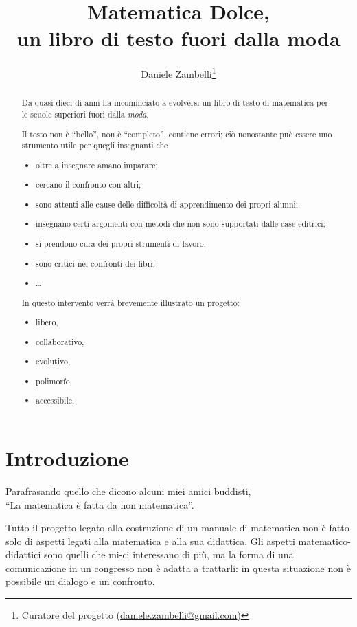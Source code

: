 \documentclass[a4paper,10pt]{article}
\title{Matematica Dolce,\\ 
un libro di testo fuori dalla moda}
\author{Daniele Zambelli\footnote{Curatore del progetto 
(\href{mailto:daniele.zambelli@gmail.com}{daniele.zambelli@gmail.com})}}
\begin{document}
\maketitle

\begin{abstract}
Da quasi dieci di anni ha incominciato a evolversi un libro di testo di 
matematica per le scuole superiori fuori dalla \emph{moda}.

Il testo non è ``bello'', non è ``completo'', contiene errori;
ciò nonostante può essere uno strumento utile per quegli insegnanti che
\begin{itemize} [noitemsep]
\item oltre a insegnare amano imparare;
\item cercano il confronto con altri;
\item sono attenti alle cause delle difficoltà di apprendimento dei propri 
alunni;
\item insegnano certi argomenti con metodi che non sono supportati dalle case 
editrici;
\item si prendono cura dei propri strumenti di lavoro;
\item sono critici nei confronti dei libri;
\item \dots
\end{itemize}

In questo intervento verrà brevemente illustrato un progetto:
\begin{itemize} [noitemsep]
\item libero,
\item collaborativo,
\item evolutivo,
\item polimorfo,
\item accessibile.
\end{itemize}

\end{abstract}

\section{Introduzione}
\begin{flushright}
Parafrasando quello che dicono alcuni miei amici buddisti, \\
``La matematica è fatta da non matematica''.
\end{flushright}

Tutto il progetto legato alla costruzione di un manuale di matematica non è 
fatto solo di aspetti legati alla matematica e alla sua didattica. 
Gli aspetti matematico-didattici sono quelli che mi-ci interessano di più, ma 
la forma di una comunicazione in un congresso non è adatta a trattarli:
in questa situazione non è possibile un dialogo e un confronto.
\end{document}
